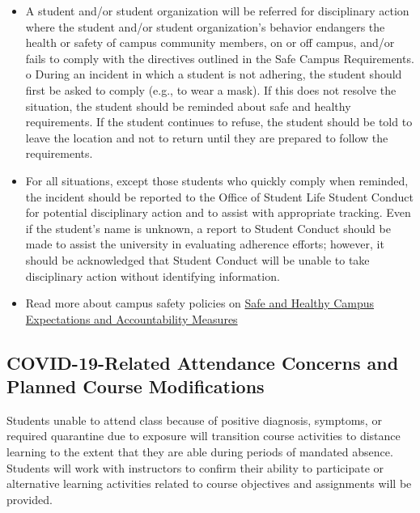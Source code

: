 \begin{itemize}
      \item
            A student and/or student organization will be referred for disciplinary action where the student and/or student organization's behavior endangers the health or safety of campus community members, on or off campus, and/or fails to comply with the directives outlined in the Safe Campus Requirements. o During an incident in which a student is not adhering, the student should first be asked to comply (e.g., to wear a mask). If this does not resolve the situation, the student should be reminded about safe and healthy requirements. If the student continues to refuse, the student should be told to leave the location and not to return until they are prepared to follow the requirements.
      \item
            For all situations, except those students who quickly comply when reminded, the incident should be reported to the Office of Student Life Student Conduct for potential disciplinary action and to assist with appropriate tracking. Even if the student's name is unknown, a report to Student Conduct should be made to assist the university in evaluating adherence efforts; however, it should be acknowledged that Student Conduct will be unable to take disciplinary action without identifying information.
      \item Read more about campus safety policies on \href{https://safeandhealthy.osu.edu/sites/default/files/2020/07/safe_and_healthy_campus_expectations_accountability_measures_7.24.2020_website.pdf?utm_campaign=oaa_faculty-staff-awareness_fy21_covid-academic-update-072720&utm_medium=email&utm_source=EOACLK}{Safe and Healthy Campus Expectations and Accountability Measures}
\end{itemize}

\subsection{COVID-19-Related Attendance Concerns and Planned Course Modifications}

Students unable to attend class because of positive diagnosis, symptoms, or required quarantine due to exposure will transition course activities to distance learning to the extent that they are able during periods of mandated absence. Students will work with instructors to confirm their ability to participate or alternative learning activities related to course objectives and assignments will be provided.

